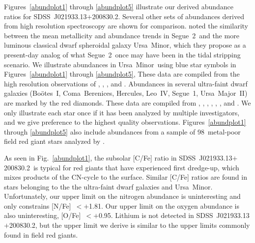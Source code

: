 \documentclass[useAMS,usenatbib,usegraphicx]{mn2e}
\def\loggf{$\log gf$}
\def\seg{\mbox{SDSS~J021933.13$+$200830.2}}
\def\seggal{\mbox{Segue~2}}
\def\umigal{\mbox{Ursa Minor}}
\def\boogal{\mbox{Bo\"{o}tes~I}}
\def\comgal{\mbox{Coma Berenices}}
\def\hergal{\mbox{Hercules}}
\def\leogal{\mbox{Leo~IV}}
\def\segigal{\mbox{Segue~1}}
\def\umagal{\mbox{Ursa Major~II}}
\begin{document}
Figures~\ref{abundplot1} through \ref{abundplot5} 
illustrate our derived abundance ratios for \seg.
Several other sets of abundances derived
from high resolution spectroscopy are shown for comparison.
\citet{kirby13} noted the similarity between the
mean metallicity and 
abundance trends in \seggal\ and the more luminous
classical dwarf spheroidal galaxy \umigal,
which they propose as a present-day analog of
what \seggal\ once may have been in the tidal stripping scenario.
We illustrate abundances in \umigal\ using blue star symbols
in Figures~\ref{abundplot1} through \ref{abundplot5},
These data are compiled from the high resolution observations of
\citet{shetrone01},
\citet{sadakane04},
\citet{cohen10}, and 
\citet{kirby12}.
Abundances in several ultra-faint dwarf galaxies 
(\boogal, \comgal, \hergal, \leogal, \segigal, \umagal)
are marked by the red diamonds.
These data are compiled from 
\citet{koch08,koch13},
\citet{feltzing09},
\citet{frebel10},
\citet{norris10a,norris10b},
\citet{simon10}, 
\citet{gilmore13}, and
\citet{ishigaki14}.
We only illustrate each star once
if it has been analyzed by multiple investigators, and we
give preference to the highest quality observations.
Figures~\ref{abundplot1} through \ref{abundplot5} 
also include abundances from a sample of 98~metal-poor 
field red giant stars analyzed by \citet{roederer14}.

As seen in Fig.~\ref{abundplot1},
the subsolar [C/Fe] ratio in \seg\ is typical for red giants 
that have experienced first dredge-up,
which mixes products of the CN-cycle to the surface.
Similar [C/Fe] ratios are found in stars belonging to
the the ultra-faint dwarf galaxies and \umigal.
Unfortunately, our upper limit on the nitrogen abundance
is uninteresting and only constrains
[N/Fe]~$< +$1.81.
Our upper limit on the oxygen abundance
is also uninteresting,
[O/Fe]~$< +$0.95.
Lithium is not detected in \seg, 
but the upper limit we derive is similar to the upper limits 
commonly found in field red giants.
\end{document}
